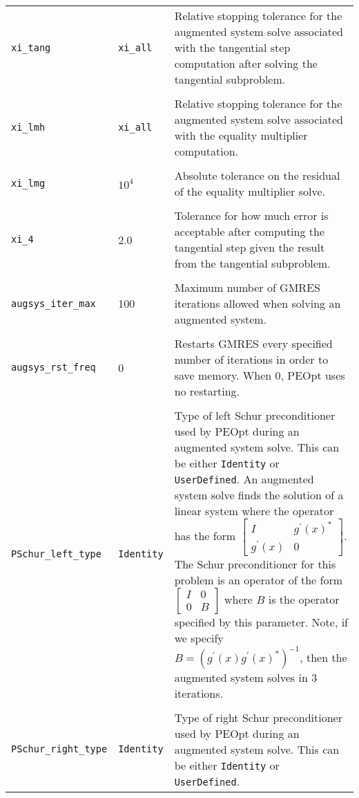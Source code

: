 \documentclass{report}
\begin{document}
\begin{longtable}{llp{}}
\\
\texttt{xi\_tang} & \texttt{xi\_all} & Relative stopping tolerance for the augmented system solve associated with the tangential step computation after solving the tangential subproblem. \\
\\
\texttt{xi\_lmh} & \texttt{xi\_all} & Relative stopping tolerance for the augmented system solve associated with the equality multiplier computation.\\
\\
\texttt{xi\_lmg} & $10^4$ & Absolute tolerance on the residual of the equality multiplier solve. \\
\\
\texttt{xi\_4} & 2.0 & Tolerance for how much error is acceptable after computing the tangential step given the result from the tangential subproblem.\\
\\
\texttt{augsys\_iter\_max} & 100 & Maximum number of GMRES iterations allowed when solving an augmented system.\\
\\
\texttt{augsys\_rst\_freq} & 0 & Restarts GMRES every specified number of iterations in order to save memory.  When 0, PEOpt uses no restarting.\\
\\
\texttt{PSchur\_left\_type} & \texttt{Identity} & Type of left Schur preconditioner used by PEOpt during an augmented system solve.  This can be either \texttt{Identity} or \texttt{UserDefined}.  An augmented system solve finds the solution of a linear system where the operator has the form $\begin{bmatrix} I & g^\prime(x)^*\\g^\prime(x) & 0\end{bmatrix}$.  The Schur preconditioner for this problem is an operator of the form $\begin{bmatrix} I & 0\\ 0 & B\end{bmatrix}$ where $B$ is the operator specified by this parameter.  Note, if we specify $B=(g^\prime(x)g^\prime(x)^*)^{-1}$, then the augmented system solves in 3 iterations.\\
\\
\texttt{PSchur\_right\_type} & \texttt{Identity} & Type of right Schur preconditioner used by PEOpt during an augmented system solve.  This can be either \texttt{Identity} or \texttt{UserDefined}.
\end{longtable}
\end{document}
